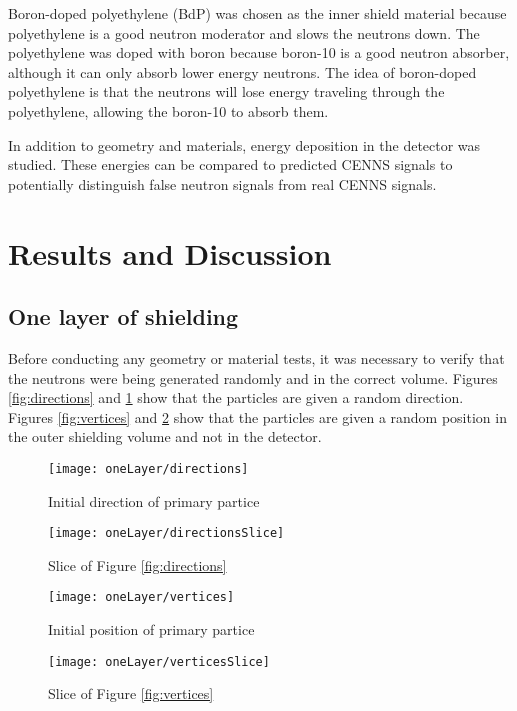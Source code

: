 \documentclass[12pt]{article}
\begin{document}
Boron-doped polyethylene (BdP) was chosen as the inner shield material because polyethylene is a good neutron moderator and slows the neutrons down. The polyethylene was doped with boron because boron-10 is a good neutron absorber, although it can only absorb lower energy neutrons. The idea of boron-doped polyethylene is that the neutrons will lose energy traveling through the polyethylene, allowing the boron-10 to absorb them.

In addition to geometry and materials, energy deposition in the detector was studied. These energies can be compared to predicted CENNS signals to potentially distinguish false neutron signals from real CENNS signals.

\section{Results and Discussion}

\subsection{One layer of shielding}

Before conducting any geometry or material tests, it was necessary to verify that the neutrons were being generated randomly and in the correct volume. Figures \ref{fig:directions} and \ref{fig:directionsSlice} show that the particles are given a random direction. Figures \ref{fig:vertices} and \ref{fig:verticesSlice} show that the particles are given a random position in the outer shielding volume and not in the detector.

\begin{figure}[H]
  \centering
  \begin{minipage}[t]{0.45\linewidth}
    \texttt{[image: oneLayer/directions]}
    \caption{Initial direction of primary partice}
    \label{fig:directions}
  \end{minipage}
  \quad
  \begin{minipage}[t]{0.45\linewidth}
    \texttt{[image: oneLayer/directionsSlice]}
    \caption{Slice of Figure \ref{fig:directions}}
    \label{fig:directionsSlice}
  \end{minipage}
\end{figure}

\begin{figure}[H]
  \centering
  \begin{minipage}[t]{0.45\linewidth}
    \texttt{[image: oneLayer/vertices]}
    \caption{Initial position of primary partice}
    \label{fig:vertices}
  \end{minipage}
  \quad
  \begin{minipage}[t]{0.45\linewidth}
    \texttt{[image: oneLayer/verticesSlice]}
    \caption{Slice of Figure \ref{fig:vertices}}
    \label{fig:verticesSlice}
  \end{minipage}
\end{figure}
\end{document}
